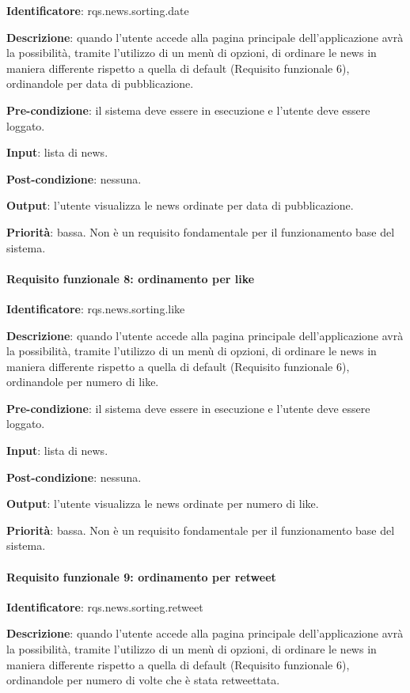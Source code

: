 \documentclass[12pt]{article}
\begin{document}
\textbf{Identificatore}: rqs.news.sorting.date

\textbf{Descrizione}: quando l'utente accede alla pagina principale dell'applicazione avrà la possibilità, tramite l'utilizzo di un menù di opzioni, di ordinare le news in maniera differente rispetto a quella di default (Requisito funzionale 6), ordinandole per data di pubblicazione.

\textbf{Pre-condizione}: il sistema deve essere in esecuzione e l'utente deve essere loggato.

\textbf{Input}: lista di news.

\textbf{Post-condizione}: nessuna.

\textbf{Output}: l'utente visualizza le news ordinate per data di pubblicazione.

\textbf{Priorità}: bassa. Non è un requisito fondamentale per il funzionamento base del sistema.

\paragraph{Requisito funzionale 8: ordinamento per like}

\textbf{Identificatore}: rqs.news.sorting.like

\textbf{Descrizione}: quando l'utente accede alla pagina principale dell'applicazione avrà la possibilità, tramite l'utilizzo di un menù di opzioni, di ordinare le news in maniera differente rispetto a quella di default (Requisito funzionale 6), ordinandole per numero di like.

\textbf{Pre-condizione}: il sistema deve essere in esecuzione e l'utente deve essere loggato.

\textbf{Input}: lista di news.

\textbf{Post-condizione}: nessuna.

\textbf{Output}: l'utente visualizza le news ordinate per numero di like.

\textbf{Priorità}: bassa. Non è un requisito fondamentale per il funzionamento base del sistema.

\paragraph{Requisito funzionale 9: ordinamento per retweet}

\textbf{Identificatore}: rqs.news.sorting.retweet

\textbf{Descrizione}: quando l'utente accede alla pagina principale dell'applicazione avrà la possibilità, tramite l'utilizzo di un menù di opzioni, di ordinare le news in maniera differente rispetto a quella di default (Requisito funzionale 6), ordinandole per numero di volte che è stata retweettata.
\end{document}
